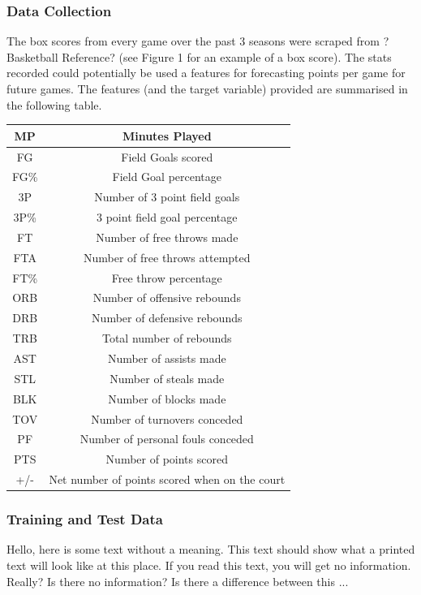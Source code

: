 \documentclass[a4paper,11pt,twoside]{article}
\begin{document}
 \subsubsection{Data Collection}
The box scores from every game over the past 3 seasons  were scraped from ?Basketball Reference? (see Figure 1 for an example of a box score). The stats recorded could potentially be used a features for forecasting points per game for future games. The features (and the target variable) provided are summarised in the following table. 

\vspace{5mm}
\begin{center}
\begin{tabular}{ |c|c| } 
 \hline
MP & Minutes Played  \\ 
 \hline
FG & Field Goals scored \\ 
 \hline
FG\% & Field Goal percentage\\ 
 \hline
3P & Number of 3 point field goals\\
 \hline
 3P\% & 3 point field goal percentage\\
\hline
FT & Number of free throws made\\
\hline
FTA & Number of free throws attempted\\
\hline
FT\% & Free throw percentage\\
\hline
ORB & Number of offensive rebounds\\
\hline
DRB & Number of defensive rebounds\\
\hline
TRB & Total number of rebounds\\
\hline
AST & Number of assists made\\
\hline
STL & Number of steals made\\
\hline
BLK & Number of blocks made\\
\hline
TOV & Number of turnovers conceded\\
\hline
PF & Number of personal fouls conceded\\
\hline
PTS & Number of points scored\\
\hline
+/- & Net number of points scored when on the court\\
\hline
\end{tabular}
\end{center}
\vspace{5mm}


 \subsubsection{Training and Test Data}
 Hello,  here  is  some  text  without  a  meaning.   This  
text  should  show  what  a printed text will look like at 
this place.  If you read this text, you will get no information.  
Really?  Is there no information?  Is there a difference between 
this ... 
\end{document}
